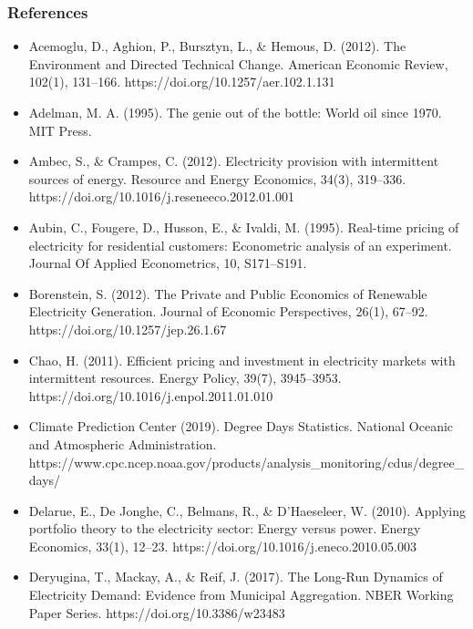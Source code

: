 \documentclass[aspectratio=169]{beamer}
\begin{document}
\begin{frame}[allowframebreaks]
\frametitle{References}
\tiny 

\begin{itemize}
	
\item Acemoglu, D., Aghion, P., Bursztyn, L., \& Hemous, D. (2012). The Environment and Directed Technical Change. American Economic Review, 102(1), 131–166. https://doi.org/10.1257/aer.102.1.131

\item Adelman, M. A. (1995). The genie out of the bottle: World oil since 1970. MIT Press.

\item Ambec, S., \& Crampes, C. (2012). Electricity provision with intermittent sources of energy. Resource and Energy Economics, 34(3), 319–336. https://doi.org/10.1016/j.reseneeco.2012.01.001

\item Aubin, C., Fougere, D., Husson, E., \& Ivaldi, M. (1995). Real-time pricing of electricity for residential customers: Econometric analysis of an experiment. Journal Of Applied Econometrics, 10, S171–S191.

\item Borenstein, S. (2012). The Private and Public Economics of Renewable Electricity Generation. Journal of Economic Perspectives, 26(1), 67–92. https://doi.org/10.1257/jep.26.1.67

\item Chao, H. (2011). Efficient pricing and investment in electricity markets with intermittent resources. Energy Policy, 39(7), 3945–3953. https://doi.org/10.1016/j.enpol.2011.01.010

\item Climate Prediction Center (2019). Degree Days Statistics. National Oceanic and Atmospheric Administration. https://www.cpc.ncep.noaa.gov/products/analysis\_monitoring/cdus/degree\_days/

\item Delarue, E., De Jonghe, C., Belmans, R., \& D’Haeseleer, W. (2010). Applying portfolio theory to the electricity sector: Energy versus power. Energy Economics, 33(1), 12–23. https://doi.org/10.1016/j.eneco.2010.05.003

\item Deryugina, T., Mackay, A., \& Reif, J. (2017). The Long-Run Dynamics of Electricity Demand: Evidence from Municipal Aggregation. NBER Working Paper Series. https://doi.org/10.3386/w23483


\end{itemize}
\end{frame}
\end{document}

